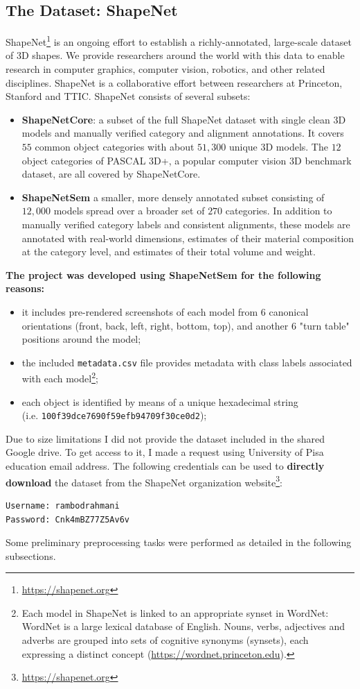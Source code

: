 \documentclass[11pt,a4paper]{article}
\begin{document}
\subsection{The Dataset: ShapeNet}
ShapeNet\footnote{\url{https://shapenet.org}} is an ongoing effort to establish a richly-annotated, large-scale dataset of 3D shapes. We provide researchers around the world with this data to enable research in computer graphics, computer vision, robotics, and other related disciplines. ShapeNet is a collaborative effort between researchers at Princeton, Stanford and TTIC.
ShapeNet consists of several subsets:
\begin{itemize}
    \item \textbf{ShapeNetCore}: a subset of the full ShapeNet dataset with single clean 3D models and manually verified category and alignment annotations. It covers $55$ common object categories with about $51,300$ unique 3D models. The $12$ object categories of PASCAL 3D+, a popular computer vision 3D benchmark dataset, are all covered by ShapeNetCore.
    \item \textbf{ShapeNetSem} a smaller, more densely annotated subset consisting of $12,000$ models spread over a broader set of $270$ categories. In addition to manually verified category labels and consistent alignments, these models are annotated with real-world dimensions, estimates of their material composition at the category level, and estimates of their total volume and weight.
\end{itemize}
\textbf{The project was developed using ShapeNetSem for the following reasons:}
\begin{itemize}
    \item it includes pre-rendered screenshots of each model from 6 canonical orientations (front, back, left, right, bottom, top), and another 6 "turn table" positions around the model;
    \item the included \texttt{metadata.csv} file provides metadata with class labels associated with each model\footnote{Each model in ShapeNet is linked to an appropriate synset in WordNet: WordNet is a large lexical database of English. Nouns, verbs, adjectives and adverbs are grouped into sets of cognitive synonyms (synsets), each expressing a distinct concept (\url{https://wordnet.princeton.edu}).};
    \item each object is identified by means of a unique hexadecimal string\\(i.e. \texttt{100f39dce7690f59efb94709f30ce0d2});
\end{itemize}
Due to size limitations I did not provide the dataset included in the shared Google drive. To get access to it, I made a request using University of Pisa education email address. The following credentials can be used to \textbf{directly download} the dataset from the ShapeNet organization website\footnote{\url{https://shapenet.org}}:
\begin{lstlisting}[language=bash,frame=single]
Username: rambodrahmani
Password: Cnk4mBZ77Z5Av6v
\end{lstlisting}
Some preliminary preprocessing tasks were performed as detailed in the following subsections.
\end{document}
